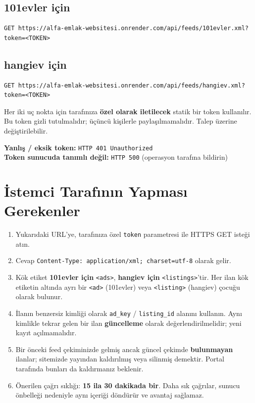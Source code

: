 \documentclass[11pt,a4paper]{article}
\begin{document}
\subsection{101evler için}

\begin{lstlisting}[style=xmlstyle]
GET https://alfa-emlak-websitesi.onrender.com/api/feeds/101evler.xml?token=<TOKEN>
\end{lstlisting}

\subsection{hangiev için}

\begin{lstlisting}[style=xmlstyle]
GET https://alfa-emlak-websitesi.onrender.com/api/feeds/hangiev.xml?token=<TOKEN>
\end{lstlisting}

\begin{warnbox}
Her iki uç nokta için tarafınıza \textbf{özel olarak iletilecek} statik bir token kullanılır. Bu token gizli tutulmalıdır; üçüncü kişilerle paylaşılmamalıdır. Talep üzerine değiştirilebilir.

\smallskip
\textbf{Yanlış / eksik token:} \texttt{HTTP 401 Unauthorized} \\
\textbf{Token sunucuda tanımlı değil:} \texttt{HTTP 500} (operasyon tarafına bildirin)
\end{warnbox}

\section{İstemci Tarafının Yapması Gerekenler}

\begin{enumerate}[leftmargin=*]
\item Yukarıdaki URL'ye, tarafınıza özel \texttt{token} parametresi ile HTTPS GET isteği atın.
\item Cevap \texttt{Content-Type: application/xml; charset=utf-8} olarak gelir.
\item Kök etiket \textbf{101evler için} \texttt{<ads>}, \textbf{hangiev için} \texttt{<listings>}'tir. Her ilan kök etiketin altında ayrı bir \texttt{<ad>} (101evler) veya \texttt{<listing>} (hangiev) çocuğu olarak bulunur.
\item İlanın benzersiz kimliği olarak \texttt{ad\_key} / \texttt{listing\_id} alanını kullanın. Aynı kimlikle tekrar gelen bir ilan \textbf{güncelleme} olarak değerlendirilmelidir; yeni kayıt açılmamalıdır.
\item Bir önceki feed çekiminizde gelmiş ancak güncel çekimde \textbf{bulunmayan} ilanlar; sitemizde yayından kaldırılmış veya silinmiş demektir. Portal tarafında bunları da kaldırmanız beklenir.
\item Önerilen çağrı sıklığı: \textbf{15 ila 30 dakikada bir}. Daha sık çağrılar, sunucu önbelleği nedeniyle aynı içeriği döndürür ve avantaj sağlamaz.
\end{enumerate}
\end{document}
